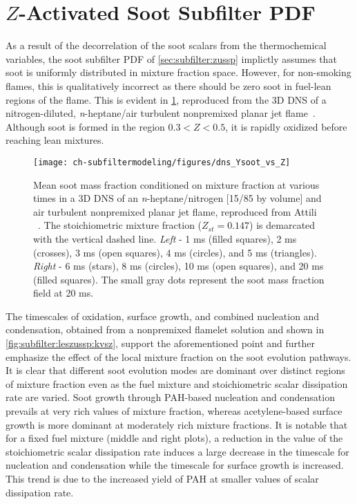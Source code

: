 \section{$Z$-Activated Soot Subfilter PDF}
\label{sec:subfilter:zassp}

As a result of the decorrelation of the soot scalars from the thermochemical variables, the soot subfilter PDF of \cref{sec:subfilter:zussp} implictly assumes that soot is uniformly distributed in mixture fraction space. However, for non-smoking flames, this is qualitatively incorrect as there should be zero soot in fuel-lean regions of the flame. This is evident in \cref{fig:subfilter:leszussp:ysvsz}, reproduced from the 3D DNS of a nitrogen-diluted, \textit{n}-heptane/air turbulent nonpremixed planar jet flame~\cite{attili2014}. Although soot is formed in the region $0.3 < Z < 0.5$, it is rapidly oxidized before reaching lean mixtures.

\begin{figure}[htb]
  \centering
  \texttt{[image: ch-subfiltermodeling/figures/dns\_Ysoot\_vs\_Z]}
  \caption[DNS of Turbulent Nonpremixed / Jet Flame, $\langle Y_{\text{s}}|Z \rangle$ vs. $Z$]{Mean soot mass fraction conditioned on mixture fraction at various times in a 3D DNS of an \textit{n}-heptane/nitrogen [15/85 by volume] and air turbulent nonpremixed planar jet flame, reproduced from Attili \etal~\cite{attili2014}. The stoichiometric mixture fraction ($Z_{st} = 0.147$) is demarcated with the vertical dashed line. \textit{Left} - 1 ms (filled squares), 2 ms (crosses), 3 ms (open squares), 4 ms (circles), and 5 ms (triangles). \textit{Right} - 6 ms (stars), 8 ms (circles), 10 ms (open squares), and 20 ms (filled squares). The small gray dots represent the soot mass fraction field at 20 ms.}
  \label{fig:subfilter:leszussp:ysvsz}
\end{figure}

The timescales of oxidation, surface growth, and combined nucleation and condensation, obtained from a nonpremixed flamelet solution and shown in \cref{fig:subfilter:leszussp:kvsz}, support the aforementioned point and further emphasize the effect of the local mixture fraction on the soot evolution pathways. It is clear that different soot evolution modes are dominant over distinct regions of mixture fraction even as the fuel mixture and stoichiometric scalar dissipation rate are varied. Soot growth through PAH-based nucleation and condensation prevails at very rich values of mixture fraction, whereas acetylene-based surface growth is more dominant at moderately rich mixture fractions. It is notable that for a fixed fuel mixture (middle and right plots), a reduction in the value of the stoichiometric scalar dissipation rate induces a large decrease in the timescale for nucleation and condensation while the timescale for surface growth is increased. This trend is due to the increased yield of PAH at smaller values of scalar dissipation rate.

